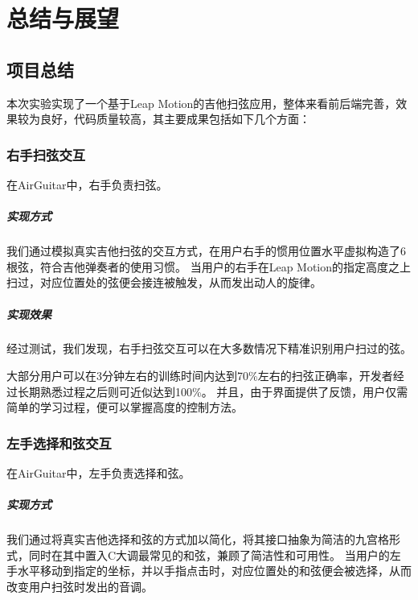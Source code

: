 \chapter{总结与展望}

    \section{项目总结}
    本次实验实现了一个基于Leap Motion的吉他扫弦应用，整体来看前后端完善，效果较为良好，代码质量较高，其主要成果包括如下几个方面：

        \subsection{右手扫弦交互}
        在AirGuitar中，右手负责扫弦。

            \paragraph{实现方式} 我们通过模拟真实吉他扫弦的交互方式，在用户右手的惯用位置水平虚拟构造了6根弦，符合吉他弹奏者的使用习惯。
            当用户的右手在Leap Motion的指定高度之上扫过，对应位置处的弦便会接连被触发，从而发出动人的旋律。

            \paragraph{实现效果} 经过测试，我们发现，右手扫弦交互可以在大多数情况下精准识别用户扫过的弦。

            大部分用户可以在3分钟左右的训练时间内达到70\%左右的扫弦正确率，开发者经过长期熟悉过程之后则可近似达到100\%。
            并且，由于界面提供了反馈，用户仅需简单的学习过程，便可以掌握高度的控制方法。

        \subsection{左手选择和弦交互}
        在AirGuitar中，左手负责选择和弦。

            \paragraph{实现方式} 我们通过将真实吉他选择和弦的方式加以简化，将其接口抽象为简洁的九宫格形式，同时在其中置入C大调最常见的和弦，兼顾了简洁性和可用性。
            当用户的左手水平移动到指定的坐标，并以手指点击时，对应位置处的和弦便会被选择，从而改变用户扫弦时发出的音调。

